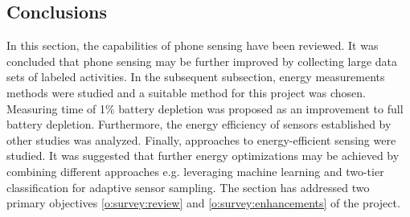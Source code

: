 \subsection{Conclusions}
\hspace{10pt} In this section, the capabilities of phone sensing have been reviewed. It was concluded that phone sensing may be further improved by collecting large data sets of labeled activities. In the subsequent subsection, energy measurements methods were studied and a suitable method for this project was chosen. Measuring time of 1\% battery depletion was proposed as an improvement to full battery depletion. Furthermore, the energy efficiency of sensors established by other studies was analyzed. Finally, approaches to energy-efficient sensing were studied. It was suggested that further energy optimizations may be achieved by combining different approaches e.g. leveraging machine learning and two-tier classification for adaptive sensor sampling. The section has addressed two primary objectives \ref{o:survey:review} and \ref{o:survey:enhancements} of the project.
